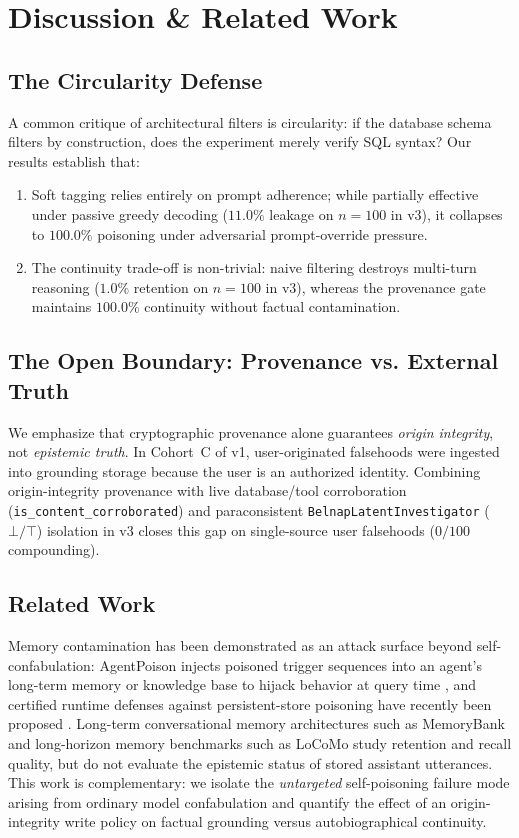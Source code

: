 \documentclass[11pt,a4paper]{article}
\begin{document}
\section{Discussion \& Related Work}
\label{sec:discussion}
\subsection{The Circularity Defense}
A common critique of architectural filters is circularity: if the database schema filters by construction, does the experiment merely verify SQL syntax? Our results establish that:
\begin{enumerate}
    \item Soft tagging relies entirely on prompt adherence; while partially effective under passive greedy decoding ($11.0\%$ leakage on $n=100$ in v3), it collapses to $100.0\%$ poisoning under adversarial prompt-override pressure.
    \item The continuity trade-off is non-trivial: naive filtering destroys multi-turn reasoning ($1.0\%$ retention on $n=100$ in v3), whereas the provenance gate maintains $100.0\%$ continuity without factual contamination.
\end{enumerate}

\subsection{The Open Boundary: Provenance vs. External Truth}
We emphasize that cryptographic provenance alone guarantees \emph{origin integrity}, not \emph{epistemic truth}. In Cohort~C of v1, user-originated falsehoods were ingested into grounding storage because the user is an authorized identity. Combining origin-integrity provenance with live database/tool corroboration (\texttt{is\_content\_corroborated}) and paraconsistent \texttt{BelnapLatentInvestigator} ($\bot/\top$) isolation in v3 closes this gap on single-source user falsehoods ($0/100$ compounding).

\subsection{Related Work}
\label{sec:related}
Memory contamination has been demonstrated as an attack surface beyond self-confabulation: AgentPoison injects poisoned trigger sequences into an agent's long-term memory or knowledge base to hijack behavior at query time \cite{agentpoison2024}, and certified runtime defenses against persistent-store poisoning have recently been proposed \cite{smsr2026}. Long-term conversational memory architectures such as MemoryBank \cite{memorybank2023} and long-horizon memory benchmarks such as LoCoMo \cite{locomo2024} study retention and recall quality, but do not evaluate the epistemic status of stored assistant utterances. This work is complementary: we isolate the \emph{untargeted} self-poisoning failure mode arising from ordinary model confabulation and quantify the effect of an origin-integrity write policy on factual grounding versus autobiographical continuity.
\end{document}
